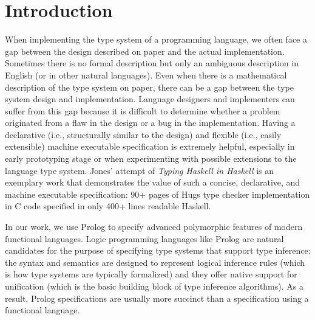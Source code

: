 \section{Introduction}\label{sec:intro}
When implementing the type system of a programming language,
we often face a gap between the design described on paper and
the actual implementation. Sometimes there is no formal description
but only an ambiguous description in English (or in other natural languages).
Even when there is a mathematical description of the type system on paper,
there can be a gap between the type system design and implementation.
Language designers and implementers can suffer from this gap because
it is difficult to determine whether a problem originated from a flaw
in the design or a bug in the implementation. Having a declarative
(i.e., structurally similar to the design)
and flexible (i.e., easily extensible) machine executable specification
is extremely helpful, especially in early prototyping stage or
when experimenting with possible extensions to the language type system.  
Jones' attempt of \emph{Typing Haskell in Haskell} \cite{JonesTHiH99} is
an exemplary work that demonstrates the value of such a concise, declarative,
and machine executable specification:
90+ pages of Hugs type checker implementation in C code specified in
only 400+ lines readable Haskell.

In our work, we use Prolog to specify advanced polymorphic features of
modern functional languages. Logic programming languages like Prolog
are natural candidates for the purpose of specifying type systems
that support type inference: the syntax and semantics are designed to represent
logical inference rules (which is how type systems are typically formalized) and
they offer native support for unification (which is the basic building block of
type inference algorithms). As a result, Prolog specifications are usually more
succinct than a specification using a functional language.

